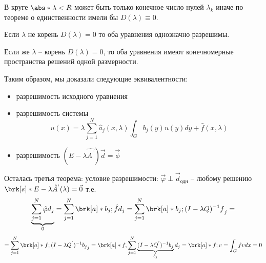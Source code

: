 \begin{itemize}
  В круге $\abs*{\lambda} < R$ может быть только конечное число нулей $\lambda_{k}$ иначе по теореме о единственности имели бы $D(\lambda) \equiv 0$.
  
  Если $\lambda$ не корень $D(\lambda) = 0$ то оба уравнения однозначно разрешимы.
  
  Если же $\lambda$ -- корень $D(\lambda) = 0$, то оба уравнения имеют конечномерные пространства решений одной размерности.
  
  Таким образом, мы доказали следующие эквивалентности:
  \begin{itemize}
    \item разрешимость исходного уравнения
    \item разрешимость системы
    $$u(x) = \lambda \sum_{j = 1}^{N}\hat{a}_{j}(x,\lambda)\int_{G}b_{j}(y)u(y)dy + \hat{f}(x,\lambda)$$
    \item разрешимость $(E - \lambda \hat{A^{'}})\vec{d} = \vec{\phi}$
  \end{itemize}
\end{itemize}
  
  Осталась третья теорема: условие разрешимости: $\vec{\varphi} \perp \vec{d}_{\text{одн}}$ -- любому решению $\brk[s]*{E - \lambda\hat{A}^{'}(\lambda)} = \vec{0}$ т.е.
  $$ \underbrace{\sum_{j=1}^{N}\hat{\varphi}d_{j}}_{0} = \sum_{j=1}^{N}\brk[a]*{b_{j}; \hat{f}}d_{j} = \sum_{j=1}^{N}\brk[a]*{b_{j}; (I - \lambda Q)^{-1}f}_{j}=$$
  $$= \sum_{j=1}^{N}\brk[a]*{f; (I - \lambda Q^{'})^{-1}b_{j}}_{j} = \brk[a]*{f, \sum_{j=1}^{N}\underbrace{(I - \lambda Q^{'})^{-1}b_{j}}_{\hat{b_{j}}}d_{j}} = \brk[a]*{f; v} = \int_{G}fvdx = 0$$